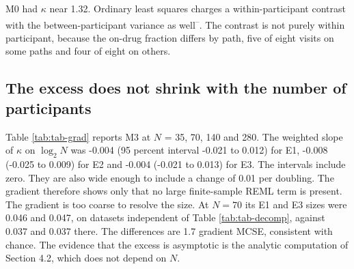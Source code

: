 \documentclass[
  11pt,
]{article}
\begin{document}
M0 had \(\kappa\) near 1.32. Ordinary least
squares charges a within-participant contrast with the
between-participant variance as well\textsuperscript{--}. The contrast is not purely
within participant, because the on-drug fraction differs by path, five
of eight visits on some paths and four of eight on others.

\subsection{The excess does not shrink with the number of participants}\label{the-excess-does-not-shrink-with-the-number-of-participants}

Table \ref{tab:tab-grad} reports M3 at \(N\) = 35, 70, 140 and 280. The
weighted slope of \(\kappa\) on \(\log_2 N\) was -0.004
(95 percent interval -0.021 to 0.012)
for E1, -0.008 (-0.025 to
0.009) for E2 and -0.004
(-0.021 to 0.013) for E3. The
intervals include zero. They are also wide enough to include a change
of 0.01 per doubling. The gradient therefore shows only that no large
finite-sample REML term is present. The gradient is too coarse to
resolve the size. At \(N = 70\) its E1 and E3 sizes were
0.046 and 0.047, on datasets independent
of Table \ref{tab:tab-decomp}, against 0.037 and
0.037 there. The differences are
1.7
gradient MCSE, consistent with chance. The evidence that the excess is
asymptotic is the analytic computation of Section 4.2, which does not
depend on \(N\).

\begin{table}
\centering
\caption{\label{tab:tab-grad}Sample-size gradient, production model M3 with the fitted mean, 1,500 replicates per point. Extended DGP ($c_\times = 0.2$, carryover decaying from the last on-drug mean). The MCSE of each $\kappa$ is about 0.02.}
\centering
{}
\end{table}
\end{document}
